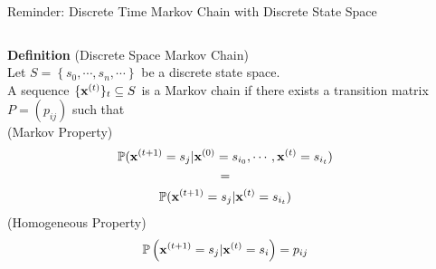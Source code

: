 \documentclass[aspectratio=169, 9pt]{beamer}
\theoremstyle{definition}
\begin{document}
\begin{frame}{Reminder: Discrete Time Markov Chain with Discrete State Space}
  \begin{columns}
  \begin{column}{0.6\textwidth}
    \textbf{Definition} (Discrete Space Markov Chain)\\
    Let $S=\left\{ s_0,\cdots,s_n,\cdots \right\}$ be a discrete state
    space.\\
    A sequence $\{\mathbf{x}^{(t)}\}_t \subseteq S$ is a Markov
    chain if there exists a transition matrix $P=(p_{ij})$ such that\\
    \vspace{0.3cm}
    (Markov Property)\\
        \begin{gather*}
          \mathbb{P}(\mathbf{x}^{(t+1)}=s_j\vert \mathbf{x}^{(0)}=s_{i_0}, \cdots,
          \mathbf{x}^{(t)}=s_{i_t})\\
        =\\
        \mathbb{P}(\mathbf{x}^{(t+1)}=s_j\vert \mathbf{x}^{(t)}=s_{i_t})
      \end{gather*}
    \vspace{0.5cm}
    (Homogeneous Property)\\
    \[
        \mathbb{P}\left( \mathbf{x}^{(t+1)}=s_j \vert \mathbf{x}^{(t)}=s_i\right)=p_{ij}
      \]
  \end{column}
    \begin{column}{0.4\textwidth}
  \end{column}%
  \end{columns}
\end{frame}
\end{document}
